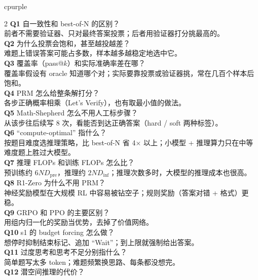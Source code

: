 \documentclass[8pt]{extarticle}
\begin{document}
\vspace{2pt}
\begin{minipage}[t]{0.625\linewidth}\vspace{0pt}
\begin{tbox}[title={自测：看完应该能回答（16 问）}]{cpurple}\normalsize\linespread{1.08}\selectfont
\begin{multicols}{2}
\textbf{Q1} 自一致性和 best-of-N 的区别？\\
前者不需要验证器、只对最终答案投票；后者用验证器打分挑最高的。\\[1pt]
\textbf{Q2} 为什么投票会饱和，甚至越投越差？\\
难题上错误答案可能占多数，样本越多越稳定地选中它。\\[1pt]
\textbf{Q3} 覆盖率（pass@$k$）和实际准确率差在哪？\\
覆盖率假设有 oracle 知道哪个对；实际要靠投票或验证器挑，常在几百个样本后饱和。\\[1pt]
\textbf{Q4} PRM 怎么给整条解打分？\\
各步正确概率相乘（Let's Verify），也有取最小值的做法。\\[1pt]
\textbf{Q5} Math-Shepherd 怎么不用人工标步骤？\\
从该步往后续写 8 次，看能否到达正确答案（hard / soft 两种标签）。\\[1pt]
\textbf{Q6} “compute-optimal” 指什么？\\
按题目难度选推理策略，比 best-of-N 省 4× 以上；小模型 + 推理算力只在中等难度题上胜过大模型。\\[1pt]
\textbf{Q7} 推理 FLOPs 和训练 FLOPs 怎么比？\\
预训练约 $6ND_{\text{pre}}$，推理约 $2ND_{\text{inf}}$；推理次数多时，大模型的推理成本也很高。\\[1pt]
\textbf{Q8} R1-Zero 为什么不用 PRM？\\
神经奖励模型在大规模 RL 中容易被钻空子；规则奖励（答案对错 + 格式）更稳。\\[1pt]
\textbf{Q9} GRPO 和 PPO 的主要区别？\\
用组内归一化的奖励当优势，去掉了价值网络。\\[1pt]
\textbf{Q10} s1 的 budget forcing 怎么做？\\
想停时抑制结束标记、追加 “Wait”；到上限就强制给出答案。\\[1pt]
\textbf{Q11} 过度思考和思考不足分别指什么？\\
简单题写太多 token；难题频繁换思路、每条都没想完。\\[1pt]
\textbf{Q12} 潜空间推理的代价？\\

\end{multicols}
\end{tbox}
\end{minipage}
\end{document}
